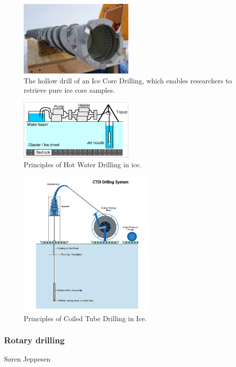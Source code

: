 \begin{figure}[htb]
  \centering
  \includegraphics[width=0.5\textwidth]{figures/mlh/ICD}
  \caption{The hollow drill of an Ice Core Drilling, which enables researchers to retrieve pure ice core samples.}
  \label{fig:ICD}
\end{figure}
\begin{figure}[htb]
  \centering
  \includegraphics[width=0.5\textwidth]{figures/mlh/HWD}
  \caption{Principles of Hot Water Drilling in ice.}
  \label{fig:HWD}
\end{figure}
\begin{figure}[htb]
  \centering
  \includegraphics[width=0.6\textwidth]{figures/mlh/CTDI}
  \caption{Principles of Coiled Tube Drilling in Ice.}
  \label{fig:CTDI}
\end{figure}

\subsubsection{Rotary drilling}
Søren Jeppesen

